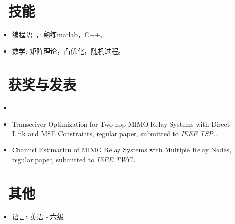 \documentclass{resume}
\begin{document}

\section{\faCogs\ 技能}
\begin{itemize}[parsep=0.5ex]
  \item 编程语言: 熟练matlab，C++。
  \item 数学: 矩阵理论，凸优化，随机过程。
\end{itemize}

\section{\faHeartO\ 获奖与发表}
\begin{itemize}[parsep=0.5ex]
\item {}
\item Transceiver Optimization for Two-hop MIMO Relay Systems with Direct Link and MSE Constraints, regular paper, submitted to \textit{IEEE TSP.}.
\item Channel Estimation of MIMO Relay Systems with Multiple Relay Nodes, regular paper, submitted to \textit{IEEE TWC.}.
\end{itemize}

\section{\faInfo\ 其他}
\begin{itemize}[parsep=0.5ex]
  \item 语言: 英语 - 六级
\end{itemize}
%
%
\end{document}
